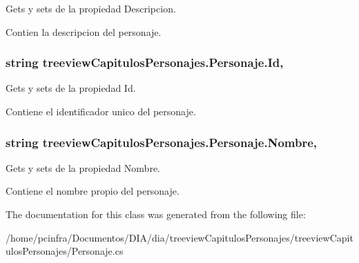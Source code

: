 Gets y sets de la propiedad Descripcion. 

Contien la descripcion del personaje. \hypertarget{classtreeview_capitulos_personajes_1_1_personaje_a30b6de2527b03f0129e2b53214b020fc}{
\subsubsection[{Id}]{\setlength{\rightskip}{0pt plus 5cm}string treeview\-Capitulos\-Personajes.\-Personaje.\-Id\hspace{0.3cm}{\ttfamily [get]}, {\ttfamily [set]}}}\label{classtreeview_capitulos_personajes_1_1_personaje_a30b6de2527b03f0129e2b53214b020fc}


Gets y sets de la propiedad Id. 

Contiene el identificador unico del personaje. \hypertarget{classtreeview_capitulos_personajes_1_1_personaje_a967f4cf934a8bbad82cf40233c94a0e4}{
\subsubsection[{Nombre}]{\setlength{\rightskip}{0pt plus 5cm}string treeview\-Capitulos\-Personajes.\-Personaje.\-Nombre\hspace{0.3cm}{\ttfamily [get]}, {\ttfamily [set]}}}\label{classtreeview_capitulos_personajes_1_1_personaje_a967f4cf934a8bbad82cf40233c94a0e4}


Gets y sets de la propiedad Nombre. 

Contiene el nombre propio del personaje. 

The documentation for this class was generated from the following file\-:\begin{DoxyCompactItemize}
\item 
/home/pcinfra/\-Documentos/\-D\-I\-A/dia/treeview\-Capitulos\-Personajes/treeview\-Capitulos\-Personajes/Personaje.\-cs\end{DoxyCompactItemize}
